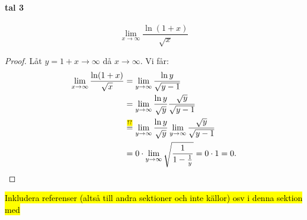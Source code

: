 \begin{ber}
	\paragraph{tal 3}

	$$
		\lim_{x\to\infty}\frac{\ln(1+x)}{\sqrt{x}}
	$$
	\begin{proof}
		Låt $y=1+x\to\infty$ då $x\to\infty$. Vi får:
		\begin{align*}
			\lim_{x\to\infty}\frac{\ln(1+x)}{\sqrt{x}}
			&=\lim_{y\to\infty}\frac{\ln y}{\sqrt{y-1}}\\
			&=\lim_{y\to\infty}\frac{\ln y}{\sqrt{y}}\frac{\sqrt{y}}{\sqrt{y-1}}\\
			&\stackrel{\text{\hl{!?}}}{=}\lim_{y\to\infty}\frac{\ln y}{\sqrt{y}}\lim_{y\to\infty}\frac{\sqrt{y}}{\sqrt{y-1}}\\
			&=0\cdot\lim_{y\to\infty}\sqrt{\frac{1}{1-\frac{1}{y}}}=0\cdot1=0.
		\end{align*}
	\end{proof}
\end{ber}

\hl{Inkludera referenser (altså till andra sektioner och inte källor) osv i denna sektion med}